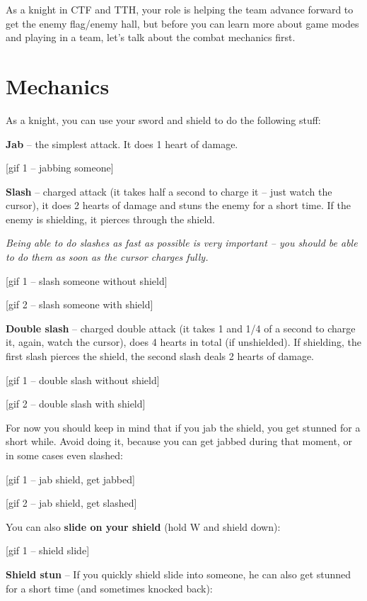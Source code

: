 \documentclass[]{book}
\begin{document}
As a knight in CTF and TTH, your role is helping the team advance forward to get the enemy flag/enemy hall, but before you can learn more about game modes and playing in a team, let's talk about the combat mechanics first.

\hypertarget{mechanics}{%
\section{Mechanics}\label{mechanics}}

As a knight, you can use your sword and shield to do the following stuff:

\textbf{Jab} -- the simplest attack. It does 1 heart of damage.

{[}gif 1 -- jabbing someone{]}

\textbf{Slash} -- charged attack (it takes half a second to charge it -- just watch the cursor), it does 2 hearts of damage and stuns the enemy for a short time. If the enemy is shielding, it pierces through the shield.

\emph{Being able to do slashes as fast as possible is very important -- you should be able to do them as soon as the cursor charges fully.}

{[}gif 1 -- slash someone without shield{]}

{[}gif 2 -- slash someone with shield{]}

\textbf{Double slash} -- charged double attack (it takes 1 and 1/4 of a second to charge it, again, watch the cursor), does 4 hearts in total (if unshielded). If shielding, the first slash pierces the shield, the second slash deals 2 hearts of damage.

{[}gif 1 -- double slash without shield{]}

{[}gif 2 -- double slash with shield{]}

For now you should keep in mind that if you jab the shield, you get stunned for a short while. Avoid doing it, because you can get jabbed during that moment, or in some cases even slashed:

{[}gif 1 -- jab shield, get jabbed{]}

{[}gif 2 -- jab shield, get slashed{]}

You can also \textbf{slide on your shield} (hold W and shield down):

{[}gif 1 -- shield slide{]}

\textbf{Shield stun} -- If you quickly shield slide into someone, he can also get stunned for a short time (and sometimes knocked back):
\end{document}
